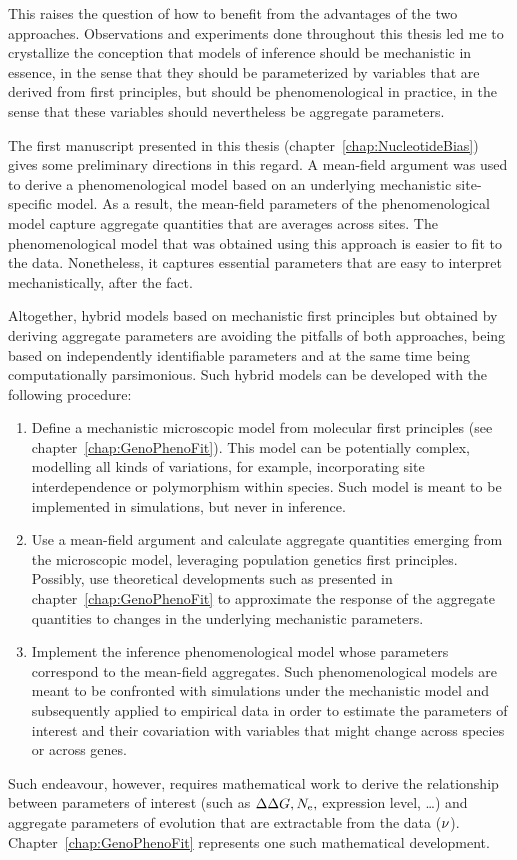 This raises the question of how to benefit from the advantages of the two approaches.
Observations and experiments done throughout this thesis led me to crystallize the conception that models of inference should be mechanistic in essence, in the sense that they should be parameterized by variables that are derived from first principles, but should be phenomenological in practice, in the sense that these variables should nevertheless be aggregate parameters.

The first manuscript presented in this thesis (chapter~\ref{chap:NucleotideBias}) gives some preliminary directions in this regard.
A mean-field argument was used to derive a phenomenological model based on an underlying mechanistic site-specific model.
As a result, the mean-field parameters of the phenomenological model capture aggregate quantities that are averages across sites.
The phenomenological model that was obtained using this approach is easier to fit to the data.
Nonetheless, it captures essential parameters that are easy to interpret mechanistically, after the fact.

Altogether, hybrid models based on mechanistic first principles but obtained by deriving aggregate parameters are avoiding the pitfalls of both approaches, being based on independently identifiable parameters and at the same time being computationally parsimonious.
Such hybrid models can be developed with the following procedure:
\begin{enumerate}
    \item Define a mechanistic microscopic model from molecular first principles (see chapter~\ref{chap:GenoPhenoFit}).
    This model can be potentially complex, modelling all kinds of variations, for example, incorporating site interdependence or polymorphism within species.
    Such model is meant to be implemented in simulations, but never in inference.
    \item Use a mean-field argument and calculate aggregate quantities emerging from the microscopic model, leveraging population genetics first principles.
    Possibly, use theoretical developments such as presented in chapter~\ref{chap:GenoPhenoFit} to approximate the response of the aggregate quantities to changes in the underlying mechanistic parameters.
    \item Implement the inference phenomenological model whose parameters correspond to the mean-field aggregates.
    Such phenomenological models are meant to be confronted with simulations under the mechanistic model and subsequently applied to empirical data in order to estimate the parameters of interest and their covariation with variables that might change across species or across genes.
\end{enumerate}
Such endeavour, however, requires mathematical work to derive the relationship between parameters of interest (such as $\Delta \Delta G, N_{\text{e}}, $ expression level, \ldots) and aggregate parameters of evolution that are extractable from the data ($\nu$).
Chapter~\ref{chap:GenoPhenoFit} represents one such mathematical development.

